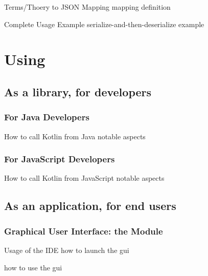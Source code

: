 \documentclass[handout]{beamer}
\begin{document}
\begin{frame}[allowframebreaks]{Terms/Thoery to JSON Mapping}
    mapping definition
\end{frame}

\begin{frame}[allowframebreaks]{Complete Usage Example}
    serialize-and-then-deserialize example
\end{frame}

\section{Using \twopkt}

\subsection{As a library, for developers}

\subsubsection{For Java Developers}

\begin{frame}[allowframebreaks]{How to call Kotlin from Java}
    notable aspects
\end{frame}

\subsubsection{For JavaScript Developers}

\begin{frame}[allowframebreaks]{How to call Kotlin from JavaScript}
    notable aspects
\end{frame}

\subsection{As an application, for end users}

\subsubsection{Graphical User Interface: the  Module}

\begin{frame}[allowframebreaks]{Usage of the IDE}
    how to launch the gui

    how to use the gui
\end{frame}
\end{document}
